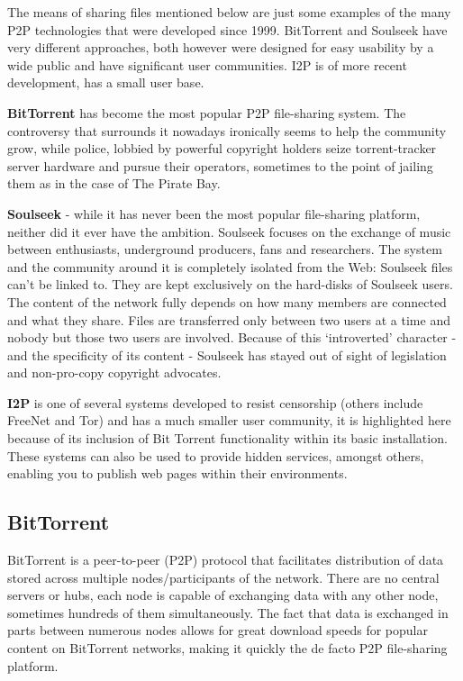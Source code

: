The means of sharing files mentioned below are just some examples of the
many P2P technologies that were developed since 1999. BitTorrent and
Soulseek have very different approaches, both however were designed for
easy usability by a wide public and have significant user communities.
I2P is of more recent development, has a small user base.

\textbf{BitTorrent} has become the most popular P2P file-sharing system.
The controversy that surrounds it nowadays ironically seems to help the
community grow, while police, lobbied by powerful copyright holders
seize torrent-tracker server hardware and pursue their operators,
sometimes to the point of jailing them as in the case of The Pirate Bay.

\textbf{Soulseek} - while it has never been the most popular
file-sharing platform, neither did it ever have the ambition. Soulseek
focuses on the exchange of music between enthusiasts, underground
producers, fans and researchers. The system and the community around it
is completely isolated from the Web: Soulseek files can't be linked to.
They are kept exclusively on the hard-disks of Soulseek users. The
content of the network fully depends on how many members are connected
and what they share. Files are transferred only between two users at a
time and nobody but those two users are involved. Because of this
`introverted' character - and the specificity of its content - Soulseek
has stayed out of sight of legislation and non-pro-copy copyright
advocates.

\textbf{I2P} is one of several systems developed to resist censorship
(others include FreeNet and Tor) and has a much smaller user community,
it is highlighted here because of its inclusion of Bit Torrent
functionality within its basic installation. These systems can also be
used to provide hidden services, amongst others, enabling you to publish
web pages within their environments.

\subsection{BitTorrent}

BitTorrent is a peer-to-peer (P2P) protocol that facilitates
distribution of data stored across multiple nodes/participants of the
network. There are no central servers or hubs, each node is capable of
exchanging data with any other node, sometimes hundreds of them
simultaneously. The fact that data is exchanged in parts between
numerous nodes allows for great download speeds for popular content on
BitTorrent networks, making it quickly the de facto P2P file-sharing
platform.

